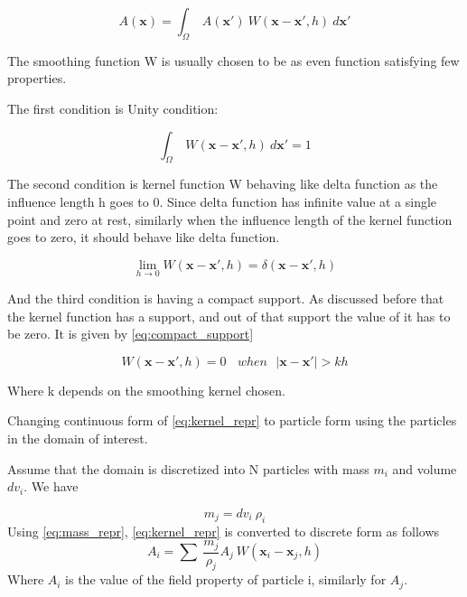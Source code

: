 \begin{equation}
  \label{eq:kernel_repr}
  A(\boldsymbol{x}) = \int_{\Omega}\> A(\boldsymbol{x}') \> W(\boldsymbol{x} - \boldsymbol{x}', h)  \> d\boldsymbol{x}'
\end{equation}

The smoothing function W is usually chosen to be as even function
satisfying few properties.

The first condition is Unity condition:

\begin{equation}
  \label{eq:unity}
  \int_{\Omega}\> W(\boldsymbol{x} - \boldsymbol{x}', h)  \> d\boldsymbol{x}' = 1
\end{equation}

The second condition is kernel function W behaving like delta function
as the influence length h goes to 0. Since delta function has infinite
value at a single point and zero at rest, similarly when the influence
length of the kernel function goes to zero, it should behave like
delta function.

\begin{equation}
  \label{eq:kernel_delta}
  \lim_{h \to 0} W(\boldsymbol{x} - \boldsymbol{x}', h) = \delta(\boldsymbol{x} - \boldsymbol{x}', h)
\end{equation}

And the third condition is having a compact support. As discussed before
that the kernel function has a support, and out of that support the value of
it has to be zero. It is given by \eqref{eq:compact_support}

\begin{equation}
  \label{eq:compact_support}
  W(\boldsymbol{x} - \boldsymbol{x}', h) = 0 \>\>\>\>    when  \>\>\> |\boldsymbol{x} - \boldsymbol{x}'| > kh
\end{equation}

Where k depends on the smoothing kernel chosen.

Changing continuous form of \eqref{eq:kernel_repr} to particle form using
the particles in the domain of interest.

Assume that the domain is discretized into N particles with mass $m_i$ and volume
$dv_i$. We have

\begin{equation}
  \label{eq:mass_repr}
  m_j = dv_i \> \rho_i
\end{equation}
Using \eqref{eq:mass_repr}, \eqref{eq:kernel_repr} is converted to
discrete form as follows
\begin{equation}
  \label{eq:discrete_form}
  A_i = \sum\> \frac{m_j}{\rho_j} A_j\> W(\boldsymbol{x}_i - \boldsymbol{x}_j, h)
\end{equation}
Where $A_i$ is the value of the field property of particle i,
similarly for $A_j$.

